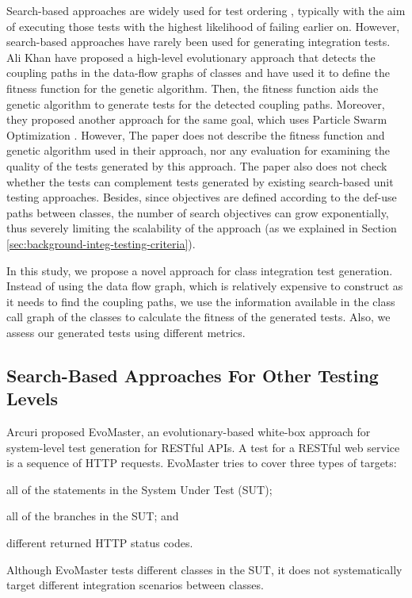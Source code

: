 Search-based approaches are widely used for test ordering \cite{Wang2010, Steindl2012, Hashim2005, Vergilio2012, Bansal2009, JIiang2019, Borner2009, Mariani2016, Guizzo2015, Abdurazik2009, DaVeigaCabral2010, Briand2003a, Vergilio2012}, typically with the aim of executing those tests with the highest likelihood of failing earlier on. %
However, search-based approaches have rarely been used for generating integration tests. Ali Khan \etal \cite{AliKhan2013} have proposed a high-level evolutionary approach that detects the coupling paths in the data-flow graphs of classes and have used it to define the fitness function for the genetic algorithm. Then, the fitness function aids the genetic algorithm to generate tests for the detected coupling paths. Moreover, they proposed another approach for the same goal, which uses Particle Swarm Optimization \cite{Khan2014}. However, The paper does not describe the fitness function and genetic algorithm used in their approach, nor any evaluation for examining the quality of the tests generated by this approach. 
The paper also does not check whether the tests can complement tests generated by existing search-based unit testing approaches. Besides, since objectives are defined according to the def-use paths between classes, the number of search objectives can grow exponentially, thus severely limiting the scalability of the approach (as we explained in Section \ref{sec:background-integ-testing-criteria}).

In this study, we propose a novel approach for class integration test generation.
Instead of using the data flow graph, which is relatively expensive to construct as it needs to find the coupling paths, we use the information available in the class call graph of the classes to calculate the fitness of the generated tests. Also, we assess our generated tests using different metrics.

\subsection{Search-Based Approaches For Other Testing Levels}

Arcuri \cite{Arcuri2019} proposed EvoMaster, an evolutionary-based white-box approach for system-level test generation for RESTful APIs. A test for a RESTful web service is a sequence of HTTP requests. EvoMaster tries to cover three types of targets:
 \begin{inparaenum}[(i)]
 \item all of the statements in the System Under Test (SUT);
 \item all of the branches in the SUT; and
\item different returned HTTP status codes.
\end{inparaenum}
Although EvoMaster tests different classes in the SUT, it does not systematically target different integration scenarios between classes.

